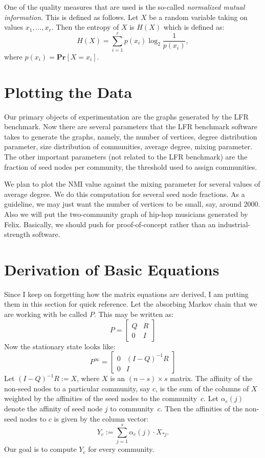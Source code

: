 \documentclass[12pt]{article}
\renewcommand{\Pr}[1]{\ensuremath{\mathbf{Pr} \left [ #1 \right]}}
\begin{document}
One of the quality measures that are used is the so-called \emph{normalized
mutual information}. This is defined as follows. Let $X$ be a random variable 
taking on values $x_1, \ldots, x_r$. Then the entropy of $X$ is $H(X)$ 
which is defined as:
\[
	H(X) = \sum_{i = 1}^r p(x_i) \log_2 \frac{1}{p(x_i)}, 
\]
where $p(x_i) = \Pr{X = x_i}$.

\section{Plotting the Data}
Our primary objects of experimentation are the graphs generated by the 
LFR benchmark. Now there are several parameters that the LFR benchmark 
software takes to generate the graphs, namely, the number of vertices, 
degree distribution parameter, size distribution of communities, average degree, 
mixing parameter. The other important parameters (not related to the LFR benchmark)
are the fraction of seed nodes per community, the threshold used to assign 
communities. 

We plan to plot the NMI value against the mixing parameter for several 
values of average degree. We do this computation for several 
seed node fractions. As a guideline, we may just want the number of vertices 
to be small, say, around 2000. Also we will put the two-community graph 
of hip-hop musicians generated by Felix. Basically, we should push for 
proof-of-concept rather than an industrial-strength software. 

\section{Derivation of Basic Equations}

Since I keep on forgetting how the matrix equations are derived, I am putting 
them in this section for quick reference. Let the absorbing Markov chain 
that we are working with be called $P$. This may be written as:
\[P  = 
\begin{bmatrix}
Q & R \\
0 & I
\end{bmatrix}
\]
Now the stationary state looks like:
\[P^{\infty}  = 
\begin{bmatrix}
0 & (I - Q)^{-1} R \\
0 & I
\end{bmatrix}
\]
Let $(I - Q)^{-1} R := X$, where $X$ is an $(n - s) \times s$ matrix. The affinity 
of the non-seed nodes to a particular community, say $c$, is the sum of the columns 
of $X$ weighted by the affinities of the seed nodes to the community~$c$. Let $\alpha_c(j)$ 
denote the affinity of seed node $j$ to community~$c$. Then the affinities of the non-seed
nodes to $c$ is given by the column vector:
\[
	Y_c := \sum_{j = 1}^{s} \alpha_c(j) \cdot X_{*j}.
\]
Our goal is to compute $Y_c$ for every community. 
\end{document}
